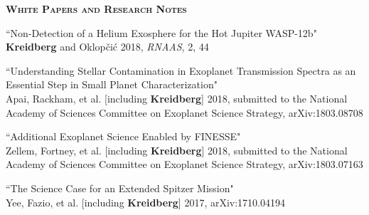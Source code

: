 \documentclass[12pt,letterpaper]{article}
\begin{document}
\vspace{5mm}

\textbf{\textsc{White Papers and Research Notes}} 
\vspace{1mm}
\begin{compactenum}
\item ``Non-Detection of a Helium Exosphere for the Hot Jupiter WASP-12b"\\
\textbf{Kreidberg} and Oklop\v{c}i\'{c} 2018, \textit{RNAAS}, 2, 44

\item ``Understanding Stellar Contamination in Exoplanet Transmission Spectra as an Essential Step in Small Planet Characterization"\\
Apai, Rackham, et al. [including \textbf{Kreidberg}] 2018, submitted to the National Academy of Sciences Committee on Exoplanet Science Strategy, arXiv:1803.08708

\item ``Additional Exoplanet Science Enabled by FINESSE"\\
Zellem, Fortney, et al. [including \textbf{Kreidberg}] 2018, submitted to the
National Academy of Sciences Committee on Exoplanet Science Strategy, arXiv:1803.07163

\item ``The Science Case for an Extended Spitzer Mission"\\
Yee, Fazio, et al. [including \textbf{Kreidberg}] 2017, arXiv:1710.04194
\end{compactenum}
\end{document}
